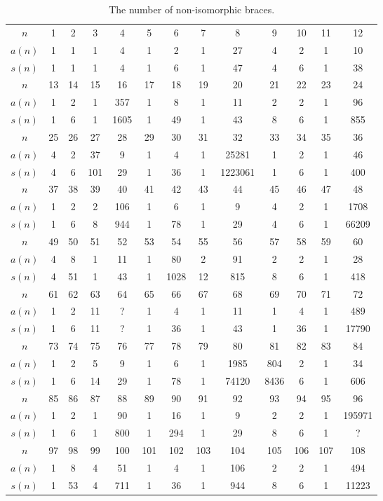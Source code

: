 \begin{table}[ht]
\centering
	\caption{The number of non-isomorphic braces.}
	\begin{tabular}{|c|cccccccccccc|}
		\hline
		$n$ & 1 & 2 & 3 & 4 & 5  & 6 & 7 & 8 & 9 & 10 & 11 & 12\tabularnewline
		$a(n)$ & 1  & 1  & 1  & 4  & 1  & 2  & 1  & 27  & 4  & 2  & 1  & 10\tabularnewline
		$s(n)$ & 1 & 1 & 1 & 4 & 1 & 6 & 1 & 47 & 4 & 6 & 1 & 38 \tabularnewline
		\hline
		$n$ & 13 & 14 & 15 & 16 & 17 & 18 & 19 & 20 & 21 & 22 & 23 & 24\tabularnewline
		$a(n)$ & 1  & 2  & 1  & 357  & 1  & 8  & 1  & 11  & 2  & 2  & 1  & 96\tabularnewline
		$s(n)$ & 1 & 6 & 1 & 1605 & 1 & 49 & 1 & 43 & 8 & 6 & 1 & 855 \tabularnewline
		\hline
		$n$ & 25 & 26 & 27 & 28 & 29 & 30 & 31 & 32 & 33 & 34 & 35 & 36\tabularnewline
		$a(n)$ & 4  & 2  & 37  & 9  & 1  & 4 & 1  & 25281  & 1  & 2  & 1  & 46\tabularnewline
		$s(n)$ & 4 & 6 & 101 & 29 & 1 & 36 & 1 & 1223061 &  1 & 6 & 1 & 400\tabularnewline
		\hline
		$n$ & 37 & 38 & 39 & 40 & 41 & 42 &  43 & 44 & 45 & 46 & 47 & 48\tabularnewline
		$a(n)$  & 1  & 2  & 2  & 106  & 1  & 6  & 1  & 9  & 4 & 2  & 1  & 1708\tabularnewline
		$s(n)$ & 1 & 6 & 8 & 944 & 1 & 78 & 1 & 29 & 4 & 6 & 1 & 66209 \tabularnewline
		\hline
		$n$    & 49 & 50 & 51 & 52 & 53 & 54 & 55 & 56 & 57 & 58 & 59 & 60\tabularnewline
		$a(n)$ &  4 & 8 & 1 & 11 & 1 & 80 & 2 & 91 & 2 & 2 & 1 & 28\tabularnewline
		$s(n)$ & 4 & 51 & 1 & 43 & 1 & 1028 &  12 & 815 & 8 & 6 & 1 & 418\tabularnewline

		\hline
		$n$ & 61 & 62 & 63 & 64 & 65 & 66 & 67 & 68 & 69 & 70 & 71 & 72\tabularnewline
		$a(n)$ & 1 & 2 & 11 & ? & 1 & 4 & 1 & 11 & 1 & 4 & 1 & 489\tabularnewline
		$s(n)$ & 1 & 6 & 11 & ? &  1 & 36 & 1 & 43 & 1 & 36 & 1 & 17790 \tabularnewline

		\hline
		$n$ & 73 & 74 & 75 & 76 & 77 & 78 & 79 & 80 & 81 & 82 & 83 & 84\tabularnewline
		$a(n)$ & 1 & 2 & 5 & 9 & 1 & 6 & 1 & 1985 & 804 & 2 & 1 & 34\tabularnewline
		$s(n)$ & 1 & 6 & 14 & 29 & 1 & 78 & 1 & 74120 & 8436 &  6 & 1 & 606\tabularnewline

		\hline
		$n$ & 85 & 86 & 87 & 88 & 89 & 90 & 91 & 92 & 93 & 94 & 95 & 96\tabularnewline
		$a(n)$ & 1 & 2 & 1 & 90 & 1 & 16 & 1 & 9 & 2 & 2 & 1 & 195971\tabularnewline
		$s(n)$ & 1 & 6 & 1 & 800 & 1 & 294 & 1 & 29 & 8 & 6 & 1 & ? \tabularnewline

		\hline
		$n$ & 97 & 98 & 99 & 100 & 101 & 102 & 103 & 104 & 105 & 106 & 107 & 108\tabularnewline
		$a(n)$ & 1 & 8 & 4 & 51 & 1 & 4 & 1 & 106 & 2 & 2 & 1 & 494 \tabularnewline
		$s(n)$ & 1 & 53 &  4 & 711 & 1 & 36 & 1 & 944 &  8 &  6 &  1 & 11223 \tabularnewline


\end{tabular}
\end{table}
